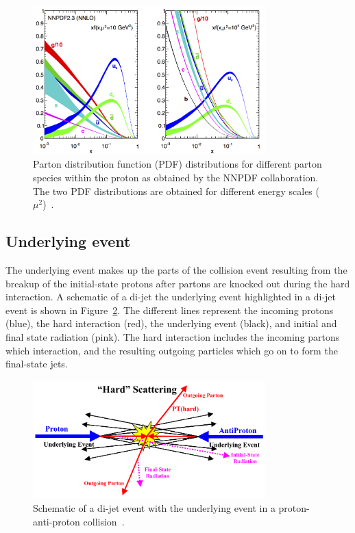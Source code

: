 \begin{figure}
  \centering
  \includegraphics[width=0.80\textwidth]{figs/mc_gen/pdfs.png}
  \caption{Parton distribution function (PDF) distributions for different
    parton species within the proton as obtained by the NNPDF collaboration.
    The two PDF distributions are obtained for different energy
    scales ($\mu^2$)~\cite{nnpdf}.
  }
  \label{fig:pdfs}
\end{figure}


\FloatBarrier
\subsection{Underlying event}
\label{sec:underlying_event}

The underlying event makes up the parts of the collision event resulting from
the breakup of the initial-state protons after partons are knocked out during
the hard interaction.
A schematic of a di-jet
the underlying event highlighted in a di-jet event is shown in
Figure~\ref{fig:underlying_event}.
The different lines represent the incoming protons (blue), the hard
interaction (red), the underlying event (black), and initial and final state
radiation (pink).
The hard interaction includes the incoming partons which interaction, and
the resulting outgoing particles which go on to form the final-state jets.

\begin{figure}
  \centering
  \includegraphics[width=0.80\textwidth]{figs/mc_gen/underlying_event.png}
  \caption{
    Schematic of a di-jet event with the underlying event in a
    proton-anti-proton collision~\cite{Field:2002vt}.
  }
  \label{fig:underlying_event}
\end{figure}

